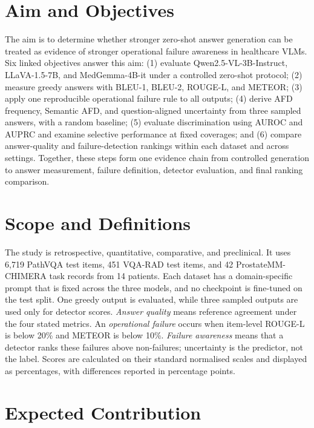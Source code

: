 \section{Aim and Objectives}

The aim is to determine whether stronger zero-shot answer generation can be treated as evidence of stronger operational failure awareness in healthcare VLMs. Six linked objectives answer this aim: (1) evaluate Qwen2.5-VL-3B-Instruct, LLaVA-1.5-7B, and MedGemma-4B-it under a controlled zero-shot protocol; (2) measure greedy answers with BLEU-1, BLEU-2, ROUGE-L, and METEOR; (3) apply one reproducible operational failure rule to all outputs; (4) derive AFD frequency, Semantic AFD, and question-aligned uncertainty from three sampled answers, with a random baseline; (5) evaluate discrimination using AUROC and AUPRC and examine selective performance at fixed coverages; and (6) compare answer-quality and failure-detection rankings within each dataset and across settings. Together, these steps form one evidence chain from controlled generation to answer measurement, failure definition, detector evaluation, and final ranking comparison.

\section{Scope and Definitions}

The study is retrospective, quantitative, comparative, and preclinical. It uses 6,719 PathVQA test items, 451 VQA-RAD test items, and 42 ProstateMM-CHIMERA task records from 14 patients. Each dataset has a domain-specific prompt that is fixed across the three models, and no checkpoint is fine-tuned on the test split. One greedy output is evaluated, while three sampled outputs are used only for detector scores. \emph{Answer quality} means reference agreement under the four stated metrics. An \emph{operational failure} occurs when item-level ROUGE-L is below 20\% and METEOR is below 10\%. \emph{Failure awareness} means that a detector ranks these failures above non-failures; uncertainty is the predictor, not the label. Scores are calculated on their standard normalised scales and displayed as percentages, with differences reported in percentage points.

\section{Expected Contribution}

